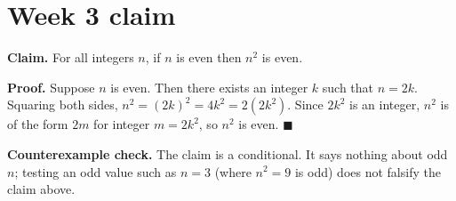 \documentclass[11pt]{article}
\begin{document}
\section*{Week 3 claim}

\textbf{Claim.} For all integers $n$, if $n$ is even then $n^2$ is even.

\textbf{Proof.} Suppose $n$ is even. Then there exists an integer $k$ such
that $n = 2k$. Squaring both sides, $n^2 = (2k)^2 = 4k^2 = 2(2k^2)$. Since
$2k^2$ is an integer, $n^2$ is of the form $2m$ for integer $m = 2k^2$, so
$n^2$ is even. $\blacksquare$

\textbf{Counterexample check.} The claim is a conditional. It says nothing
about odd $n$; testing an odd value such as $n = 3$ (where $n^2 = 9$ is odd)
does not falsify the claim above.
\end{document}
